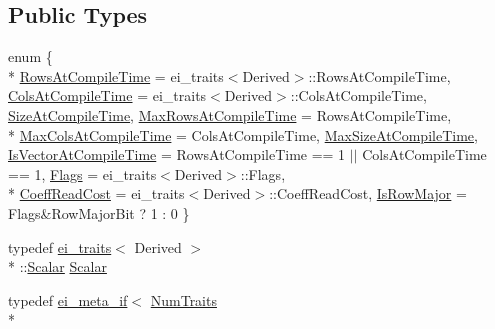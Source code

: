 \subsection*{Public Types}
\begin{DoxyCompactItemize}
\item 
enum \{ \\*
\hyperlink{class_sparse_matrix_base_af601f771c204b3ca254a52085525004ca6f1c32affc05e36001dd1643129f15a9}{Rows\-At\-Compile\-Time} = ei\-\_\-traits$<$Derived$>$\-:\-:Rows\-At\-Compile\-Time, 
\hyperlink{class_sparse_matrix_base_af601f771c204b3ca254a52085525004ca121f168f43ca4df38f99335271cad6e4}{Cols\-At\-Compile\-Time} = ei\-\_\-traits$<$Derived$>$\-:\-:Cols\-At\-Compile\-Time, 
\hyperlink{class_sparse_matrix_base_af601f771c204b3ca254a52085525004cafc395f389ed423e885388eb180675329}{Size\-At\-Compile\-Time}, 
\hyperlink{class_sparse_matrix_base_af601f771c204b3ca254a52085525004ca248d922f0b02681c856b09facdff4c56}{Max\-Rows\-At\-Compile\-Time} = Rows\-At\-Compile\-Time, 
\\*
\hyperlink{class_sparse_matrix_base_af601f771c204b3ca254a52085525004ca1774f33d2e95409b461086d93a50681e}{Max\-Cols\-At\-Compile\-Time} = Cols\-At\-Compile\-Time, 
\hyperlink{class_sparse_matrix_base_af601f771c204b3ca254a52085525004caaff778f0e170bb585d96d54e40ffe320}{Max\-Size\-At\-Compile\-Time}, 
\hyperlink{class_sparse_matrix_base_af601f771c204b3ca254a52085525004ca60728c54efd6879668dcab00a53fa5a5}{Is\-Vector\-At\-Compile\-Time} = Rows\-At\-Compile\-Time == 1 $|$$|$ Cols\-At\-Compile\-Time == 1, 
\hyperlink{class_sparse_matrix_base_af601f771c204b3ca254a52085525004cadb11b5d4625dc81c28848af1ec6dac18}{Flags} = ei\-\_\-traits$<$Derived$>$\-:\-:Flags, 
\\*
\hyperlink{class_sparse_matrix_base_af601f771c204b3ca254a52085525004ca270260c3d748de75eb35d6c08e859e33}{Coeff\-Read\-Cost} = ei\-\_\-traits$<$Derived$>$\-:\-:Coeff\-Read\-Cost, 
\hyperlink{class_sparse_matrix_base_af601f771c204b3ca254a52085525004cab1c0e4cad7f5e1ae0211abbed1591a9c}{Is\-Row\-Major} = Flags\&Row\-Major\-Bit ? 1 \-: 0
 \}
\item 
typedef \hyperlink{structei__traits}{ei\-\_\-traits}$<$ Derived $>$\\*
\-::\hyperlink{class_sparse_matrix_base_af39d70f2b7e775e9e17b666cd24128c8}{Scalar} \hyperlink{class_sparse_matrix_base_af39d70f2b7e775e9e17b666cd24128c8}{Scalar}
\item 
typedef \hyperlink{structei__meta__if}{ei\-\_\-meta\-\_\-if}$<$ \hyperlink{struct_num_traits}{Num\-Traits}\\*
$$
\end{DoxyCompactItemize}
